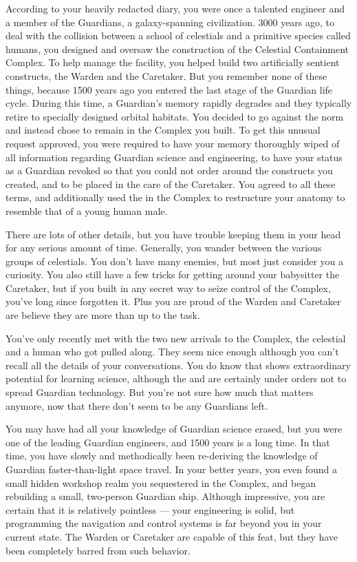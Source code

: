 \documentclass[char]{guardians}
\begin{document}
\name{\cJascha{}}

According to your heavily redacted diary, you were once a talented engineer and a member of the Guardians, a galaxy-spanning civilization. 3000 years ago, to deal with the collision between a school of celestials and a primitive species called humans, you designed and oversaw the construction of the Celestial Containment Complex. To help manage the facility, you helped build two artificially sentient constructs, the Warden and the Caretaker. But you remember none of these things, because 1500 years ago you entered the last stage of the Guardian life cycle. During this time, a Guardian's memory rapidly degrades and they typically retire to specially designed orbital habitats. You decided to go against the norm and instead chose to remain in the Complex you built. To get this unusual request approved, you were required to have your memory thoroughly wiped of all information regarding Guardian science and engineering, to have your status as a Guardian revoked so that you could not order around the constructs you created, and to be placed in the care of the Caretaker. You agreed to all these terms, and additionally used the \assembler{} in the Complex to restructure your anatomy to resemble that of a young human male.

There are lots of other details, but you have trouble keeping them in your head for any serious amount of time. Generally, you wander between the various groups of celestials. You don't have many enemies, but most just consider you a curiosity. You also still have a few tricks for getting around your babysitter the Caretaker, but if you built in any secret way to seize control of the Complex, you've long since forgotten it. Plus you are proud of the Warden and Caretaker are believe they are more than up to the task.

You've only recently met with the two new arrivals to the Complex, the celestial \cUnity{} and a human \cKachiko{\intro} who got pulled along. They seem nice enough although you can't recall all the details of your conversations. You do know that \cKachiko{} shows extraordinary potential for learning science, although the \cCaretaker{} and \cWarden{} are certainly under orders not to spread Guardian technology. But you're not sure how much that matters anymore, now that there don't seem to be any Guardians left.

You may have had all your knowledge of Guardian science erased, but you were one of the leading Guardian engineers, and 1500 years is a long time. In that time, you have slowly and methodically been re-deriving the knowledge of Guardian faster-than-light space travel. In your better years, you even found a small hidden workshop realm you sequestered in the Complex, and began rebuilding a small, two-person Guardian ship. Although impressive, you are certain that it is relatively pointless --- your engineering is solid, but programming the navigation and control systems is far beyond you in your current state. The Warden or Caretaker are capable of this feat, but they have been completely barred from such behavior.
\end{document}
